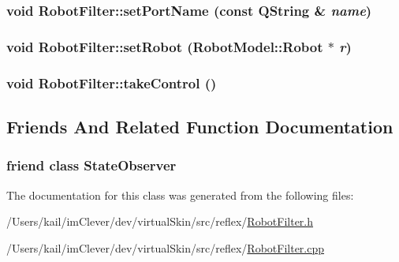 \label{class_robot_filter_ab9eb900478b4c2836666570c79f9d1f2}
\hypertarget{class_robot_filter_a870f04dabea13ff84cd2ba5d0d172d44}{
\subsubsection[{setPortName}]{\setlength{\rightskip}{0pt plus 5cm}void RobotFilter::setPortName (const QString \& {\em name})}}
\label{class_robot_filter_a870f04dabea13ff84cd2ba5d0d172d44}
\hypertarget{class_robot_filter_a2044bbedf65a8ec40c65650d295d6376}{
\subsubsection[{setRobot}]{\setlength{\rightskip}{0pt plus 5cm}void RobotFilter::setRobot ({\bf RobotModel::Robot} $\ast$ {\em r})}}
\label{class_robot_filter_a2044bbedf65a8ec40c65650d295d6376}
\hypertarget{class_robot_filter_a63edcdd59785cfbf70d099ba14766180}{
\subsubsection[{takeControl}]{\setlength{\rightskip}{0pt plus 5cm}void RobotFilter::takeControl ()}}
\label{class_robot_filter_a63edcdd59785cfbf70d099ba14766180}


\subsection{Friends And Related Function Documentation}
\hypertarget{class_robot_filter_a298aa88af98a8b88e7f9a11ded16a587}{
\subsubsection[{StateObserver}]{\setlength{\rightskip}{0pt plus 5cm}friend class {\bf StateObserver}}}
\label{class_robot_filter_a298aa88af98a8b88e7f9a11ded16a587}


The documentation for this class was generated from the following files:\begin{DoxyCompactItemize}
\item 
/Users/kail/imClever/dev/virtualSkin/src/reflex/\hyperlink{_robot_filter_8h}{RobotFilter.h}\item 
/Users/kail/imClever/dev/virtualSkin/src/reflex/\hyperlink{_robot_filter_8cpp}{RobotFilter.cpp}\end{DoxyCompactItemize}
